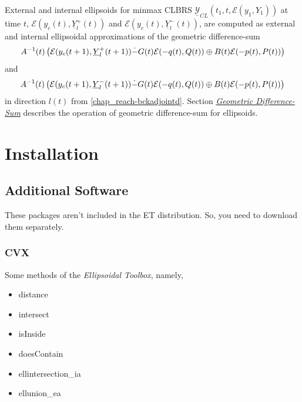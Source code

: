 \documentclass[letterpaper,10pt,english]{sphinxmanual}
\begin{document}
External and internal ellipsoids for minmax CLBRS
\(\underline{{\mathcal Y}}_{CL}(t_1,t,{\mathcal E}(y_1,Y_1))\) at
time \(t\), \({\mathcal E}(y_c(t),\underline{Y}^+_l(t))\) and
\({\mathcal E}(y_c(t),\underline{Y}^-_l(t))\), are computed as
external and internal ellipsoidal approximations of the geometric
difference-sum
\begin{gather}
\begin{split}A^{-1}(t)\left(
{\mathcal E}(y_c(t+1),\underline{Y}^+_l(t+1))
\dot{-}G(t){\mathcal E}(-q(t),Q(t))
\oplus B(t){\mathcal E}(-p(t),P(t))
\right)\end{split}\notag
\end{gather}
and
\begin{gather}
\begin{split}A^{-1}(t)\left(
{\mathcal E}(y_c(t+1),\underline{Y}^-_l(t+1))
\dot{-}G(t){\mathcal E}(-q(t),Q(t))
\oplus B(t){\mathcal E}(-p(t),P(t))
\right)\end{split}\notag
\end{gather}
in direction \(l(t)\) from \eqref{chap_reach-bckadjointd}. Section
{\hyperref[chap_ellcalc:diff-sum-label]{\emph{Geometric Difference-Sum}}} describes the operation of geometric
difference-sum for ellipsoids.


\chapter{Installation}
\label{chap_install:installation}\label{chap_install::doc}

\section{Additional Software}
\label{chap_install:additional-software}
These packages aren’t included in the ET distribution. So, you need to
download them separately.


\subsection{CVX}
\label{chap_install:cvx}
Some methods of the \emph{Ellipsoidal Toolbox}, namely,
\begin{itemize}
\item {} 
distance

\item {} 
intersect

\item {} 
isInside

\item {} 
doesContain

\item {} 
ellintersection\_ia

\item {} 
ellunion\_ea

\end{itemize}
\end{document}
